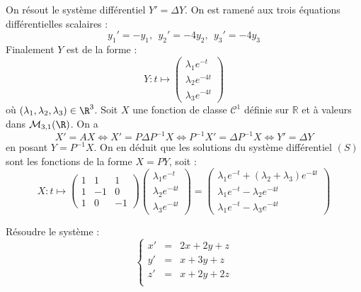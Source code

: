 \documentclass[a4paper,twoside,french,11pt]{VcCours}
\begin{document}
On résout le système différentiel $Y' = \Delta Y$. On est ramené aux trois équations différentielles scalaires : 
$$y_1' = -y_1, ~~ y_2' = -4 y_2 ,~~y_3' = -4 y_3$$
Finalement $Y$ est de la forme :
$$Y : t \mapsto \left(\begin{array}{c} \lambda_1 e^{-t} \\ \lambda_2 e^{-4t} \\ \lambda_3 e^{-4t}\end{array}\right)$$
où $(\lambda_1, \lambda_2, \lambda_3) \in \R^3$.
Soit $X$ une fonction de classe $\mathcal C^1$ définie sur $\mathbb R$ et à valeurs dans $\mathcal{M}_{3,1}(\R)$. On a 
$$X' = AX \iff X' = P\Delta P^{-1}X \iff P^{-1}X' = \Delta P^{-1}X \iff Y' = \Delta Y$$
en posant $Y = P^{-1}X$. On en déduit que les solutions du système différentiel $(S)$ sont les fonctions de la forme $X = PY$, soit : 
$$X : t \mapsto \left(\begin{array}{ccc} 1 & 1 & 1 \\ 1 & -1 & 0 \\ 1 & 0 & -1 \end{array}\right)\left(\begin{array}{c} \lambda_1 e^{-t} \\ \lambda_2 e^{-4t} \\ \lambda_3 e^{-4t}\end{array}\right) = \left(\begin{array}{c} \lambda_1 e^{-t} + (\lambda_2+\lambda_3)e^{-4t} \\ \lambda_1 e^{-t} - \lambda_2 e^{-4t} \\ \lambda_1 e^{-t} - \lambda_3 e^{-4t}\end{array}\right)$$

\begin{Exercice}{} Résoudre le système :
$$ \left\lbrace \begin{array}{ccl}
x' & = &2x+2y+z \\
y' & = &x+3y+z \\
z' & =& x+2y+2z \\
\end{array}\right.$$
\end{Exercice}
\end{document}
